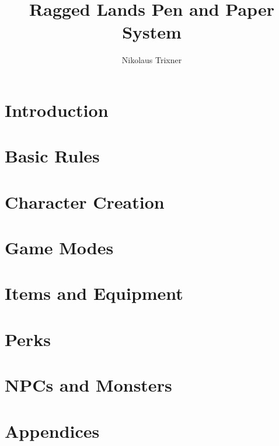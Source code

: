 \documentclass{book}
\begin{document}
	
	\title{Ragged Lands Pen and Paper System}
	\author{Nikolaus Trixner}
	
	\maketitle
	\tableofcontents
\part{Introduction}
\part{Basic Rules}
\part{Character Creation}
\part{Game Modes}
\part{Items and Equipment}
\part{Perks}
\part{NPCs and Monsters}
\part{Appendices}
\end{document}
